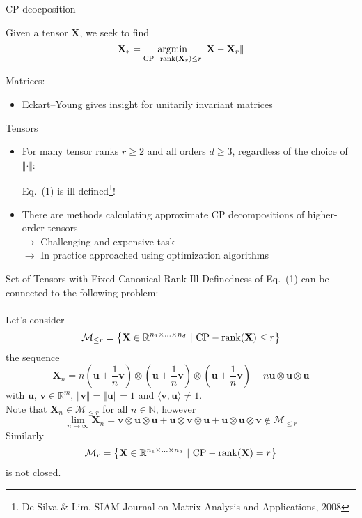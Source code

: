 \documentclass{beamer}
\newcommand{\bvec}[1]{\mathbf{#1}}
\newcommand{\vu}{\bvec{u}}
\newcommand{\vv}{\bvec{v}}
\newcommand{\vX}{\bvec{X}}
\newcommand{\bitem}{\item[$\bullet$]}
\begin{document}
\begin{frame}{CP deocposition}


Given a tensor $\vX$, we seek to find 
\begin{equation}
\label{eq:CPrank}
\vX_*
=
\underset{{\rm CP-rank}(\vX_r) \leq r}{\rm argmin} \Vert \vX - \vX_r \Vert
\end{equation}

Matrices:
\begin{itemize}
    \bitem Eckart--Young gives insight for unitarily invariant matrices
\end{itemize}

Tensors
\begin{itemize}
    \bitem For many tensor ranks $r\geq 2$ and all orders $d\geq 3$, regardless of the choice of $\Vert \cdot \Vert $:\\
    \begin{center}
    Eq.~(1) is ill-defined\footnote{De Silva \& Lim, SIAM Journal on Matrix Analysis and Applications, 2008}!
    \end{center}
    \bitem There are methods calculating approximate CP decompositions of higher-order tensors\\
    $\rightarrow$ Challenging and expensive task\\ 
    $\rightarrow$ In practice approached using optimization algorithms
\end{itemize}


\end{frame}

\begin{frame}{Set of Tensors with Fixed Canonical Rank}
Ill-Definedness of Eq.~(1) can be connected to the following problem:\\
~\\
Let's consider 
\begin{equation*}
\mathcal{M}_{\leq r}
=
\left\lbrace
\vX \in \mathbb{R}^{n_1 \times ... \times n_d}~|~
{\rm CP-rank} (\vX) \leq r
\right\rbrace
\end{equation*}
the sequence
$$
\vX_n
=n
\left(
\vu + \frac{1}{n} \vv
\right)
\otimes 
\left(
\vu + \frac{1}{n} \vv
\right)
\otimes 
\left(
\vu + \frac{1}{n} \vv
\right)
-
n \vu \otimes \vu \otimes \vu 
$$
with $\vu$, $\vv \in\mathbb{R}^m$, $\Vert \vv \Vert = \Vert \vu \Vert =1$ and $\langle \vv, \vu \rangle \neq 1$.\\
\pause
Note that $\vX_n \in \mathcal{M}_{\leq r}$ for all $n\in\mathbb{N}$, however
$$
\lim_{n\to \infty} \vX_n 
=
\vv \otimes \vu \otimes \vu +
\vu \otimes \vv \otimes \vu +
\vu \otimes \vu \otimes \vv
\notin \mathcal{M}_{\leq r}
$$
\pause
Similarly 
\begin{equation*}
\mathcal{M}_{r}
=
\left\lbrace
\vX \in \mathbb{R}^{n_1 \times ... \times n_d}~|~
{\rm CP-rank} (\vX) = r
\right\rbrace
\end{equation*}
is not closed.

\end{frame}
\end{document}
